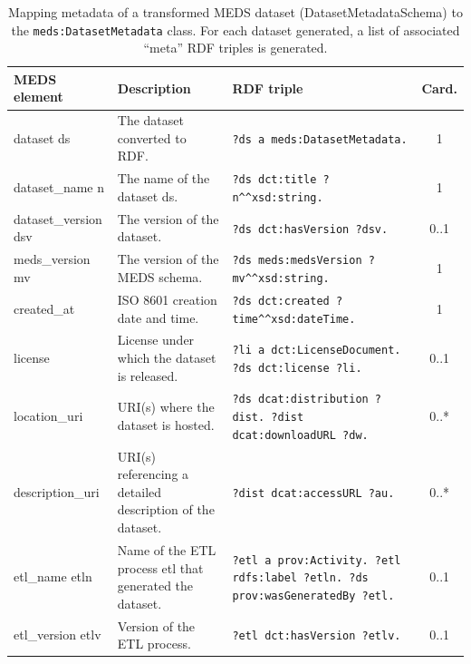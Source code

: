 \begin{table}[htbp]
	\centering
	\caption{Mapping metadata of a transformed MEDS dataset (DatasetMetadataSchema) to the \texttt{meds:DatasetMetadata} class. For each dataset generated, a list of associated ``meta'' RDF triples is generated.}
	\label{tab:paper3_dataset}
	\setlength{\tabcolsep}{2pt}
\begin{tabularx}{\textwidth}{l >{\raggedright\arraybackslash}X >{\raggedright\arraybackslash}X c}		\toprule
		\textbf{MEDS element} & \textbf{Description} & \textbf{RDF triple} & \textbf{Card.} \\
		\midrule
		dataset ds & The dataset converted to RDF. & \texttt{?ds a meds:DatasetMetadata.%
		} & 1 \\
		dataset\_name n & The name of the dataset ds. & \texttt{?ds dct:title ?n}\texttt{\string^\string^}\texttt{xsd:string.} & 1 \\
		dataset\_version dsv& The version of the dataset. & \texttt{?ds dct:hasVersion ?dsv.} & 0..1 \\
		meds\_version mv& The version of the MEDS schema. & \texttt{?ds meds:medsVersion ?mv}\texttt{\string^\string^}\texttt{xsd:string.} & 1 \\
		created\_at & ISO 8601 creation date and time. & \texttt{?ds dct:created ?time}\texttt{\string^\string^}\texttt{xsd:dateTime.} & 1 \\
		license & License under which the dataset is released. & \texttt{?li a dct:LicenseDocument. \break ?ds dct:license ?li.} & 0..1 \\
		location\_uri & URI(s) where the dataset is hosted. & \texttt{?ds dcat:distribution ?dist. \break ?dist dcat:downloadURL ?dw.} & 0..* \\
		description\_uri & URI(s) referencing a detailed description of the dataset. & \texttt{?dist dcat:accessURL ?au.} & 0..* \\
		etl\_name etln& Name of the ETL process etl that generated the dataset. & \texttt{?etl a prov:Activity. \break ?etl rdfs:label ?etln. \break ?ds prov:wasGeneratedBy ?etl.} & 0..1 \\
		etl\_version etlv& Version of the ETL process. & 
		\texttt{?etl dct:hasVersion ?etlv.} & 0..1 \\
		\bottomrule
\end{tabularx}
\end{table}
%

